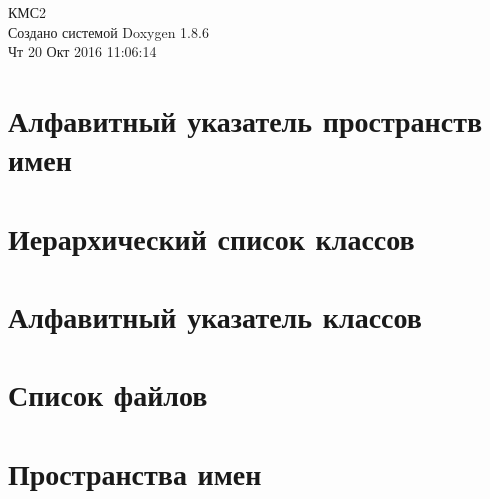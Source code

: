 \documentclass[twoside]{book}
\newcommand{\clearemptydoublepage}{%
  \newpage{\pagestyle{empty}\cleardoublepage}%
}
\begin{document}
\hypersetup{pageanchor=false}
\begin{titlepage}
\vspace*{7cm}
\begin{center}%
{\Large КМС2 }\\
\vspace*{1cm}
{\large Создано системой Doxygen 1.8.6}\\
\vspace*{0.5cm}
{\small Чт 20 Окт 2016 11:06:14}\\
\end{center}
\end{titlepage}
\clearemptydoublepage
\tableofcontents
\clearemptydoublepage
{}
\hypersetup{pageanchor=true}

\chapter{Алфавитный указатель пространств имен}

\chapter{Иерархический список классов}

\chapter{Алфавитный указатель классов}

\chapter{Список файлов}

\chapter{Пространства имен}






\end{document}
